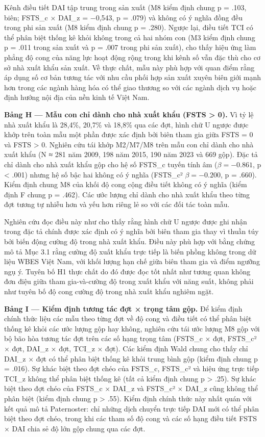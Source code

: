 \documentclass[12pt,a4paper]{article}
\begin{document}
Kênh điều tiết DAI tập trung trong sản xuất (M8 kiểm định chung p =
.103, biên; FSTS\_c × DAI\_z = −0,543, p = .079) và không có ý nghĩa
đồng đều trong phi sản xuất (M8 kiểm định chung p = .280). Ngược lại,
điều tiết TCI có thể phân biệt thống kê khỏi không trong cả hai nhóm con
(M3 kiểm định chung p = .011 trong sản xuất và p = .007 trong phi sản
xuất), cho thấy hiệu ứng làm phẳng độ cong của năng lực hoạt động rộng
trong khi kênh số vẫn đặc thù cho cơ sở nhà xuất khẩu sản xuất. Về thực
chất, mẫu này phù hợp với quan điểm rằng áp dụng số cơ bản tương tác với
nhu cầu phối hợp sản xuất xuyên biên giới mạnh hơn trong các ngành hàng
hóa có thể giao thương so với các ngành dịch vụ hoặc định hướng nội địa
của nền kinh tế Việt Nam.

\textbf{Bảng H --- Mẫu con chỉ dành cho nhà xuất khẩu (FSTS
\textgreater{} 0).} Vì tỷ lệ nhà xuất khẩu là 28,4\%, 20,7\% và 18,8\%
qua các đợt, hình chữ U ngược được khớp trên toàn mẫu một phần được xác
định bởi biên tham gia giữa FSTS = 0 và FSTS \textgreater{} 0. Nghiên
cứu tái khớp M2/M7/M8 trên mẫu con chỉ dành cho nhà xuất khẩu (N ≈ 281
năm 2009, 198 năm 2015, 190 năm 2023 và 669 gộp). Đặc tả chỉ dành cho
nhà xuất khẩu gộp cho hệ số FSTS\_c tuyến tính âm (\(\beta = −0.861\), p
\textless{} .001) nhưng hệ số bậc hai không có ý nghĩa (FSTS\_c²
\(\beta = −0.200\), p = .660). Kiểm định chung M8 của khối độ cong cộng
điều tiết không có ý nghĩa (kiểm định F chung p = .462). Các ước lượng
chỉ dành cho nhà xuất khẩu theo từng đợt tương tự nhiễu hơn và yếu hơn
riêng lẻ so với các đối tác toàn mẫu.

Nghiên cứu đọc điều này như cho thấy rằng hình chữ U ngược được ghi nhận
trong đặc tả chính được xác định có ý nghĩa bởi biên tham gia thay vì
thuần túy bởi biến động cường độ trong nhà xuất khẩu. Điều này phù hợp
với bằng chứng mô tả Mục 3.1 rằng cường độ xuất khẩu trực tiếp là biến
phồng không trong dữ liệu WBES Việt Nam, với khối lượng hạn chế giữa
biên tham gia và điểm ngưỡng ngụ ý. Tuyên bố H1 thực chất do đó được đọc
tốt nhất như tương quan không đơn điệu giữa tham gia-và-cường độ trong
xuất khẩu với năng suất, không phải như tuyên bố độ cong cường độ trong
nhà xuất khẩu nghiêm ngặt.

\textbf{Bảng I --- Kiểm định tương tác đợt × trọng tâm gộp.} Để kiểm
định chính thức liệu các mẫu theo từng đợt về độ cong và điều tiết có
thể phân biệt thống kê khỏi các ước lượng gộp hay không, nghiên cứu tái
ước lượng M8 gộp với bộ bão hòa tương tác đợt trên các số hạng trọng tâm
(FSTS\_c × đợt, FSTS\_c² × đợt, DAI\_z × đợt, TCI\_z × đợt). Các kiểm
định Wald chung cho thấy chỉ DAI\_z × đợt có thể phân biệt thống kê khỏi
trung bình gộp (kiểm định chung p = .016). Sự khác biệt theo đợt chéo
của FSTS\_c, FSTS\_c² và hiệu ứng trực tiếp TCI\_z không thể phân biệt
thống kê (tất cả kiểm định chung p \textgreater{} .25). Sự khác biệt
theo đợt chéo của FSTS\_c × DAI\_z và FSTS\_c² × DAI\_z cũng không thể
phân biệt (kiểm định chung p \textgreater{} .55). Kiểm định chính thức
này nhất quán với kết quả mô tả Paternoster: chỉ những dịch chuyển trực
tiếp DAI mới có thể phân biệt theo đợt chéo, trong khi các tham số độ
cong và các số hạng điều tiết FSTS × DAI chia sẻ độ lớn gộp chung qua
các đợt.
\end{document}
